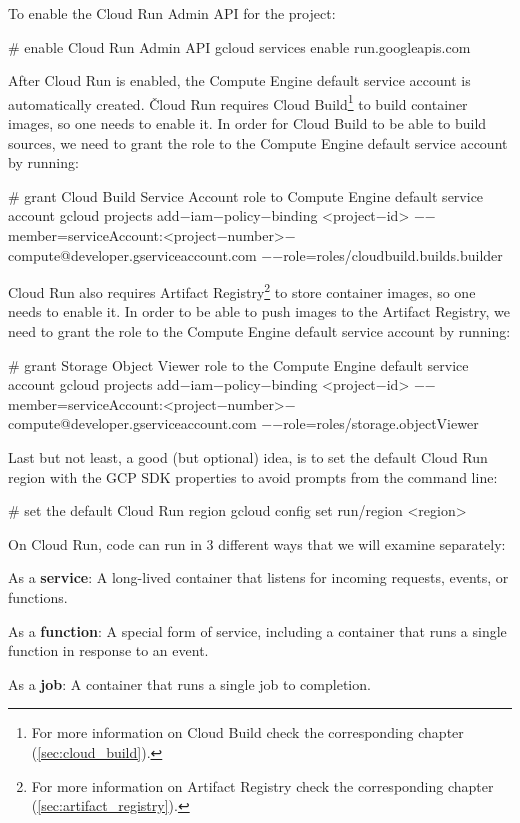 To enable the Cloud Run Admin API for the project:
\begin{bash}
# enable Cloud Run Admin API
gcloud services enable run.googleapis.com
\end{bash}

After Cloud Run is enabled, the Compute Engine default service account is automatically created. \v

Cloud Run requires Cloud Build\footnote{For more information on Cloud Build check the corresponding chapter
(\ref{sec:cloud_build}).} to build container images, so one needs to enable it. In order for Cloud Build to be able to
build sources, we need to grant the  role to the Compute Engine default service
account by running:
\begin{bash}
# grant Cloud Build Service Account role to Compute Engine default service account
gcloud projects add$-$iam$-$policy$-$binding <project$-$id>
    $-$$-$member=serviceAccount:<project$-$number>$-$compute@developer.gserviceaccount.com
    $-$$-$role=roles/cloudbuild.builds.builder
\end{bash}

Cloud Run also requires Artifact Registry\footnote{For more information on Artifact Registry check the corresponding
chapter (\ref{sec:artifact_registry}).} to store container images, so one needs to enable it. In order to be able to
push images to the Artifact Registry, we need to grant the  role to the Compute Engine
default service account by running:
\begin{bash}
# grant Storage Object Viewer role to the Compute Engine default service account
gcloud projects add$-$iam$-$policy$-$binding <project$-$id>
    $-$$-$member=serviceAccount:<project$-$number>$-$compute@developer.gserviceaccount.com
    $-$$-$role=roles/storage.objectViewer
\end{bash}

Last but not least, a good (but optional) idea, is to set the default Cloud Run region with the GCP SDK properties to
avoid prompts from the command line:
\begin{bash}
# set the default Cloud Run region
gcloud config set run/region <region>
\end{bash}

On Cloud Run, code can run in 3 different ways that we will examine separately:
\bit
\item As a \textbf{service}: A long-lived container that listens for incoming requests, events, or functions.
\item As a \textbf{function}: A special form of service, including a container that runs a single function in response
to an event.
\item As a \textbf{job}: A container that runs a single job to completion.
\eit

